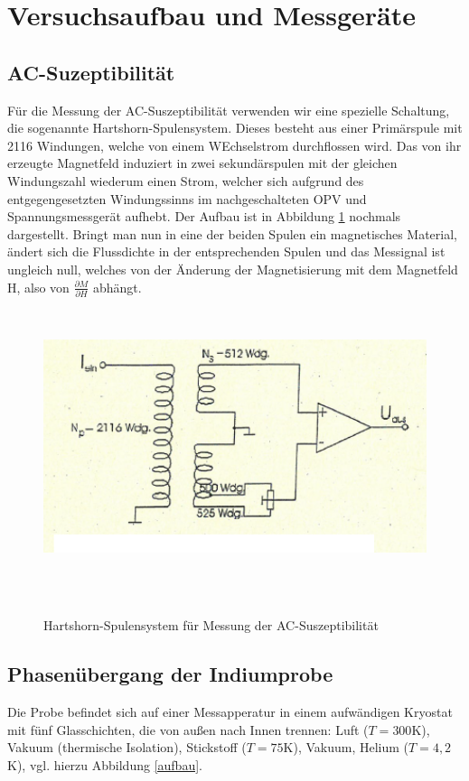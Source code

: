 \section{Versuchsaufbau und Messgeräte}
\subsection{AC-Suzeptibilität}
Für die Messung der AC-Suszeptibilität verwenden wir eine spezielle Schaltung, die sogenannte Hartshorn-Spulensystem. Dieses besteht aus einer Primärspule mit 2116 Windungen, welche von einem WEchselstrom durchflossen wird. Das von ihr erzeugte Magnetfeld induziert in zwei sekundärspulen mit der gleichen Windungszahl wiederum einen Strom, welcher sich aufgrund des entgegengesetzten Windungssinns im nachgeschalteten OPV und Spannungsmessgerät aufhebt. Der Aufbau ist in Abbildung \ref{aufbau-AC} nochmals dargestellt. Bringt man nun in eine der beiden Spulen ein magnetisches Material, ändert sich die Flussdichte in der entsprechenden Spulen und das Messignal ist ungleich null, welches von der Änderung der Magnetisierung mit dem Magnetfeld H, also von $\frac{\partial M}{\partial H}$ abhängt.


\begin{figure}[h!]
	\centering
	\includegraphics[height=8cm]{AC-auf.png}	
	~ %
	\caption{Hartshorn-Spulensystem für Messung der AC-Suszeptibilität \cite{Anleitung}}
	\label{aufbau-AC}
\end{figure}

\subsection{Phasenübergang der Indiumprobe}
Die Probe befindet sich auf einer Messapperatur in einem aufwändigen Kryostat mit fünf Glasschichten, die von außen nach Innen trennen: Luft ($T=300$K), Vakuum (thermische Isolation), Stickstoff ($T=75$K), Vakuum, Helium ($T=4,2$K), vgl. hierzu Abbildung \ref{aufbau}.

